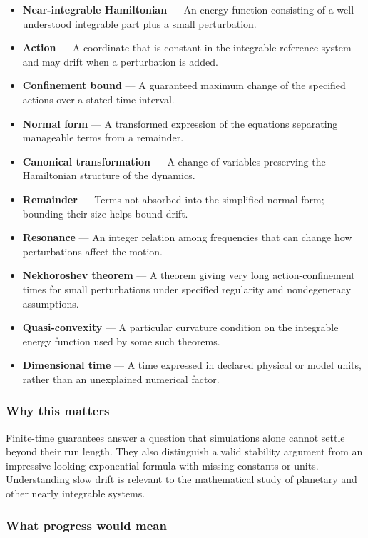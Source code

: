 \documentclass[
  11pt,
]{article}
\begin{document}
\begin{itemize}
\item
  \textbf{Near-integrable Hamiltonian} --- An energy function consisting
  of a well-understood integrable part plus a small perturbation.
\item
  \textbf{Action} --- A coordinate that is constant in the integrable
  reference system and may drift when a perturbation is added.
\item
  \textbf{Confinement bound} --- A guaranteed maximum change of the
  specified actions over a stated time interval.
\item
  \textbf{Normal form} --- A transformed expression of the equations
  separating manageable terms from a remainder.
\item
  \textbf{Canonical transformation} --- A change of variables preserving
  the Hamiltonian structure of the dynamics.
\item
  \textbf{Remainder} --- Terms not absorbed into the simplified normal
  form; bounding their size helps bound drift.
\item
  \textbf{Resonance} --- An integer relation among frequencies that can
  change how perturbations affect the motion.
\item
  \textbf{Nekhoroshev theorem} --- A theorem giving very long
  action-confinement times for small perturbations under specified
  regularity and nondegeneracy assumptions.
\item
  \textbf{Quasi-convexity} --- A particular curvature condition on the
  integrable energy function used by some such theorems.
\item
  \textbf{Dimensional time} --- A time expressed in declared physical or
  model units, rather than an unexplained numerical factor.
\end{itemize}

\subsubsection{Why this matters}

Finite-time guarantees answer a question that simulations alone cannot
settle beyond their run length. They also distinguish a valid stability
argument from an impressive-looking exponential formula with missing
constants or units. Understanding slow drift is relevant to the
mathematical study of planetary and other nearly integrable systems.

\subsubsection{What progress would mean}
\end{document}
